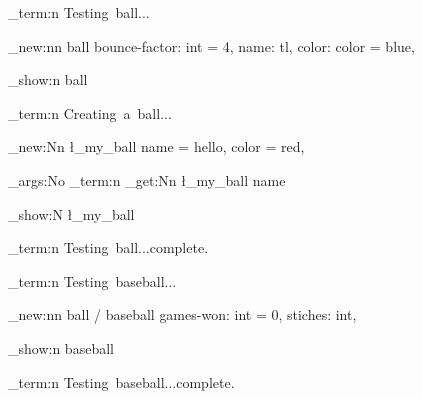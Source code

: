 \msg_term:n { Testing~ball... }

\obj_new:nn { ball }
  {
    bounce-factor: int = 4,
    name: tl,
    color: color = blue,
  }

\obj_show:n { ball }


\msg_term:n { Creating~a~ball... }

\ball_new:Nn \l_my_ball
  {
    name = hello,
    color = red,
  }

\exp_args:No \msg_term:n { \ball_get:Nn \l_my_ball { name } }

\ball_show:N \l_my_ball

\msg_term:n { Testing~ball...complete. }


\msg_term:n { Testing~baseball... }

\obj_new:nn { ball / baseball }
  {
    games-won: int = 0,
    stiches: int,
  }

\obj_show:n { baseball }

\msg_term:n { Testing~baseball...complete. }


\bye
